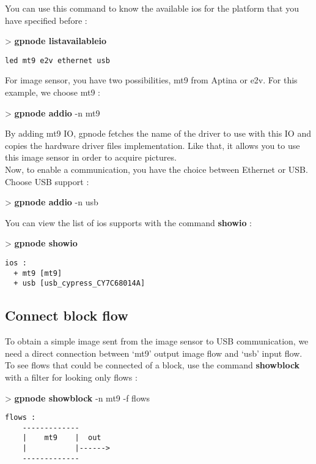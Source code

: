 \documentclass[10pt,a4paper]{article}
\begin{document}
You can use this command to know the available ios for the platform that you have specified before :
\begin{sample}
> \textbf{gpnode listavailableio}
\begin{Verbatim}
led mt9 e2v ethernet usb
\end{Verbatim}
\end{sample}

For image sensor, you have two possibilities, mt9 from Aptina or e2v. For this example, we choose mt9 :

\begin{sample}
> \textbf{gpnode addio} -n mt9
\end{sample}

By adding mt9 IO, gpnode fetches the name of the driver to use with this IO and copies the hardware driver files implementation. Like that, it allows you to use this image sensor in order to acquire pictures.\\

Now, to enable a communication, you have the choice between Ethernet or USB. Choose USB support :

\begin{sample}
> \textbf{gpnode addio} -n usb
\end{sample}

You can view the list of ios supports with the command \textbf{showio} :

\begin{sample}
> \textbf{gpnode showio}
\begin{Verbatim}
ios :
  + mt9 [mt9]
  + usb [usb_cypress_CY7C68014A]
\end{Verbatim}
\end{sample}

\subsection{Connect block flow}
To obtain a simple image sent from the image sensor to USB communication, we need a direct connection between `mt9' output image flow and `usb' input flow. To see flows that could be connected of a block, use the command \textbf{showblock} with a filter for looking only flows :

\begin{sample}
> \textbf{gpnode showblock} -n mt9 -f flows
\begin{Verbatim}
flows :
    -------------       
    |    mt9    |  out  
    |           |------>
    -------------
\end{Verbatim}
\end{sample}
\end{document}
